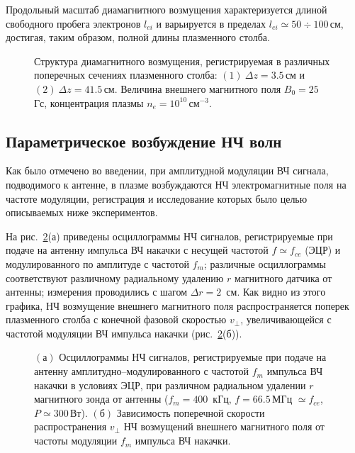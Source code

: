 \documentclass[10pt]{disser}
\begin{document}
Продольный масштаб диамагнитного возмущения характеризуется длиной свободного пробега электронов $l_{ei}$ и варьируется в пределах $l_{ei}\simeq{}50\div{}100$\,см, достигая, таким образом, полной длины плазменного столба. 

\begin{figure}[H]
    \centering
    \def\svgwidth{0.75\columnwidth} %
    
    \caption{Структура диамагнитного возмущения, регистрируемая в различных поперечных сечениях плазменного столба: $(1)\ {}\Delta{}z=3.5$\,см и $(2)\ {}\Delta{}z=41.5$\,см. Величина внешнего магнитного поля $B_{0}=25$\, Гс, концентрация плазмы $n_{e}=10^{10}$\,см$^{-3}$.}
    \label{fig:pic1HARM_L3+L1RAD}
\end{figure}
\subsection{Параметрическое возбуждение НЧ волн}
Как было отмечено во введении, при амплитудной модуляции ВЧ сигнала, подводимого к антенне, в плазме возбуждаются НЧ электромагнитные поля на частоте модуляции, регистрация и исследование которых было целью описываемых ниже экспериментов.

На \mbox{рис.~\ref{fig:phase_composite}(а)} приведены  осциллограммы НЧ сигналов, регистрируемые при подаче на антенну импульса ВЧ накачки с несущей частотой $f\simeq{}f_{ce}$ (ЭЦР) и модулированного по амплитуде с частотой $f_{m}$; различные осциллограммы соответствуют различному радиальному удалению $r$ магнитного датчика от антенны; измерения проводились с шагом $\Delta{}r = 2$~см. Как видно из этого графика, НЧ возмущение внешнего магнитного поля распространяется поперек плазменного столба с конечной фазовой скоростью $v_{\perp}$, увеличивающейся с частотой модуляции ВЧ импульса накачки (\mbox{рис.~\ref{fig:phase_composite}(б)}).
\begin{figure}[H]
  \centering
  \def\svgwidth{0.6\columnwidth} %
  
  \caption{$(а)$ Осциллограммы НЧ сигналов, регистрируемые при подаче на антенну амплитудно--модулированного с частотой $f_{m}$ импульса ВЧ накачки в условиях ЭЦР, при различном радиальном удалении $r$ магнитного зонда от антенны ($f_{m} = 400$\, кГц, $f=66.5$\,МГц $\simeq f_{ce}$, $P\simeq 300$\,Вт). $(б)$ Зависимость поперечной скорости распространения $v_{\perp}$ НЧ возмущений внешнего магнитного поля от частоты модуляции $f_{m}$ импульса ВЧ накачки.}
  \label{fig:phase_composite}
\end{figure} 
\end{document}
